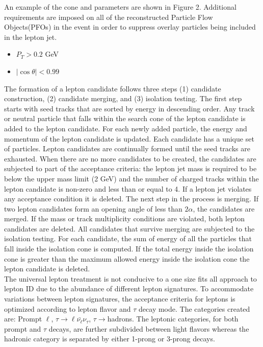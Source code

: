 An example of the cone and parameters are shown in Figure 2. Additional requirements are imposed on all of the reconstructed Particle Flow Objects(PFOs) in the event in order to suppress overlay particles being included in the lepton jet.
\begin{itemize}
\item $P_T > 0.2$ GeV
\item $|\cos\theta| < 0.99$
\end{itemize}
The formation of a lepton candidate follows three steps (1) candidate construction, (2) candidate merging, and (3) isolation testing.
The first step starts with seed tracks that are sorted by energy in descending order. Any track or neutral particle that falls within the search cone of the lepton candidate is added to the lepton candidate. For each newly added particle, the energy and momentum of the lepton candidate is updated. Each candidate has a unique set of particles. Lepton candidates are continually formed until the seed tracks are exhausted. When there are no more candidates to be created, the candidates are subjected to part of the acceptance criteria: the lepton jet mass is required to be below the upper mass limit (2 GeV) and the number of charged tracks within the lepton candidate is non-zero and less than or equal to 4. If a lepton jet violates any acceptance condition it is deleted. The next step in the process is merging. If two lepton candidates form an opening angle of less than $2\alpha$, the candidates are merged. If the mass or track multiplicity conditions are violated, both lepton candidates are deleted.  All  candidates that survive merging are subjected to the isolation testing. For each candidate, the sum of energy of all the particles that fall inside the isolation cone is computed. If the total energy inside the isolation cone is greater than the maximum allowed energy inside the isolation cone the lepton candidate is deleted.\\

	The universal lepton treatment is not conducive to a one size fits all approach to lepton ID due to the abundance of different lepton signatures. To accommodate variations between lepton signatures, the acceptance criteria for leptons is optimized according to lepton flavor and $\tau$ decay mode. The categories created are: Prompt $\ell$, $\tau \rightarrow \ell\bar{\nu_{\ell}} \nu_{\tau}$, $\tau \rightarrow $hadrons. The leptonic categories, for both prompt and $\tau$ decays, are further subdivided between light flavors whereas the hadronic category is separated by either 1-prong or 3-prong decays.\\



